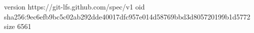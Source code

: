 version https://git-lfs.github.com/spec/v1
oid sha256:9ec6efb9bc5c02ab292dde40017dfc957e014d58769bbd3d805720199b1d5772
size 6561
